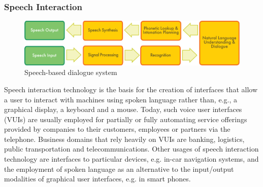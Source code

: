 \begin{multicols}{2}
\subsubsection{Speech Interaction}

\begin{figure}[htb]
  \center
  \includegraphics[width=\textwidth]{../_media/english/simple_speech-based_dialogue_architecture}
  \caption{Speech-based dialogue system}
  \label{fig:dialoguearch_en}
\end{figure}

Speech interaction technology is the basis for the creation of interfaces that allow a user to interact with machines using spoken language rather than, e.g., a graphical display, a keyboard and a mouse. Today, such voice user interfaces (VUIs) are usually employed for partially or fully automating service offerings provided by companies to their customers, employees or partners via the telephone. Business domains that rely heavily on VUIs are banking, logistics, public transportation and telecommunications. Other usages of speech interaction technology are interfaces to particular devices, e.g. in-car navigation systems, and the employment of spoken language as an alternative to the input/output modalities of graphical user interfaces, e.g. in smart phones.


\end{multicols}
